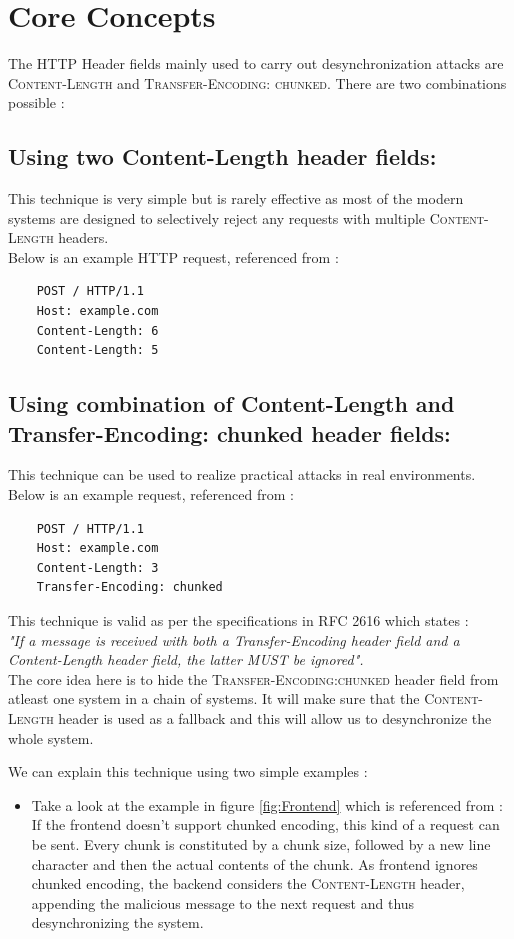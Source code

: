 \chapter{Core Concepts}
The HTTP Header fields mainly used to carry out desynchronization attacks are \textsc{Content-Length} and \textsc{Transfer-Encoding: chunked}. There are two combinations possible : 
\section{Using two Content-Length header fields:}
	This technique is very simple but is rarely effective as most of the modern systems are designed to selectively reject any requests with multiple \textsc{Content-Length} headers.\\
	Below is an example HTTP request, referenced from \cite{b6}:
	\begin{verbatim}
	POST / HTTP/1.1
	Host: example.com
	Content-Length: 6
	Content-Length: 5
	\end{verbatim}
\section{Using combination of Content-Length and Transfer-Encoding: chunked header fields:}This technique can be used to realize practical attacks in real environments. 
	Below is an example request, referenced from \cite{b6}:
	\begin{verbatim}
	POST / HTTP/1.1
	Host: example.com
	Content-Length: 3
	Transfer-Encoding: chunked
	\end{verbatim}
	This technique is valid as per the specifications in RFC 2616\cite{b10} which states : \\
	\textit{"If a message is received with both a Transfer-Encoding header field and a Content-Length header field, the latter MUST be ignored".}\\
	The core idea here is to hide the \textsc{Transfer-Encoding:chunked} header field from atleast one system in a chain of systems. It will make sure that the \textsc{Content-Length} header is used as a fallback and this will allow us to desynchronize the whole system.

We can explain this technique using two simple examples : 
\begin{itemize}
	\item Take a look at the example in figure \ref{fig:Frontend} which is referenced from \cite{b6}:
	If the frontend doesn't support chunked encoding, this kind of a request can be sent. Every chunk is constituted by a chunk size, followed by a new line character and then the actual contents of the chunk. As frontend ignores chunked encoding, the backend considers the \textsc{Content-Length} header, appending the malicious message to the next request and thus desynchronizing the system.
\end{itemize}

